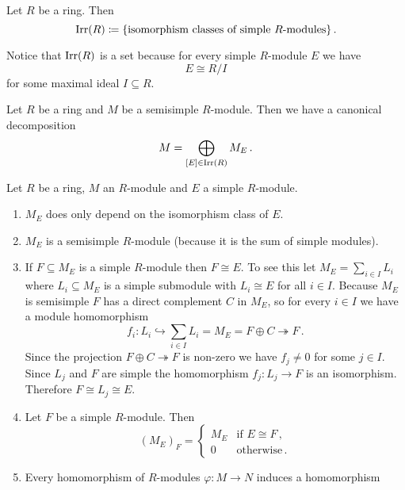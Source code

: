 \begin{defi}
  Let $R$ be a ring.
  Then
  \[
              \operatorname{Irr}(R)
    \coloneqq \{\text{isomorphism classes of simple $R$-modules}\} \,.
  \]
\end{defi}


Notice that $\operatorname{Irr}(R)$ is a set because for every simple $R$-module $E$ we have
\[
        E
  \cong R/I
\]
for some maximal ideal $I \subseteq R$.


\begin{cor}\label{cor: canonical decomposition semisimple module}
  Let $R$ be a ring and $M$ be a semisimple $R$-module.
  Then we have a canonical decomposition
  \[
      M
    = \bigoplus_{[E] \in \operatorname{Irr}(R)} M_E \,.
  \]
\end{cor}


\begin{rem}
    Let $R$ be a ring, $M$ an $R$-module and $E$ a simple $R$-module.
  \begin{enumerate}[label=\emph{\alph*)},leftmargin=*]
    \item
      $M_E$ does only depend on the isomorphism class of $E$.
    \item
      $M_E$ is a semisimple $R$-module (because it is the sum of simple modules).
    \item
      If $F \subseteq M_E$ is a simple $R$-module then $F \cong E$.
      To see this let $M_E = \sum_{i \in I} L_i$ where $L_i \subseteq M_E$ is a simple submodule with $L_i \cong E$ for all $i \in I$.
      Because $M_E$ is semisimple $F$ has a direct complement $C$ in $M_E$, so for every $i \in I$ we have a module homomorphism
      \[
                            f_i
        \colon              L_i
        \hookrightarrow     \sum_{i \in I} L_i
        =                   M_E
        =                   F \oplus C
        \twoheadrightarrow  F \,.
      \]
      Since the projection $F \oplus C \twoheadrightarrow F$ is non-zero we have $f_j \neq 0$ for some $j \in I$.
      Since $L_j$ and $F$ are simple the homomorphism $f_j \colon L_j \to F$ is an isomorphism.
      Therefore $F \cong L_j \cong E$.
    \item
      Let $F$ be a simple $R$-module.
      Then
      \[
          (M_E)_F
        = \begin{cases}
            M_E & \text{if } E \cong F \,,  \\
              0 & \text{otherwise} \,.
          \end{cases}
      \]
    \item
      Every homomorphism of $R$-modules $\varphi \colon M \to N$ induces a homomorphism

\end{enumerate}
\end{rem}
